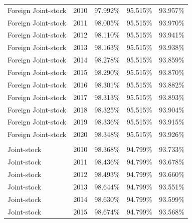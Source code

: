 \documentclass[
  12pt,
  a4paper,
]{scrreprt}
\begin{document}
{{{{\begin{longtable}[t]{llrrr}
\hspace{1em}Foreign Joint-stock & 2010 & 97.992\% & 95.515\% & 93.957\%\\
\hspace{1em}Foreign Joint-stock & 2011 & 98.005\% & 95.515\% & 93.970\%\\
\hspace{1em}Foreign Joint-stock & 2012 & 98.110\% & 95.515\% & 93.941\%\\
\hspace{1em}Foreign Joint-stock & 2013 & 98.163\% & 95.515\% & 93.938\%\\
\hspace{1em}Foreign Joint-stock & 2014 & 98.278\% & 95.515\% & 93.859\%\\
\hspace{1em}Foreign Joint-stock & 2015 & 98.290\% & 95.515\% & 93.870\%\\
\hspace{1em}Foreign Joint-stock & 2016 & 98.301\% & 95.515\% & 93.882\%\\
\hspace{1em}Foreign Joint-stock & 2017 & 98.313\% & 95.515\% & 93.893\%\\
\hspace{1em}Foreign Joint-stock & 2018 & 98.325\% & 95.515\% & 93.904\%\\
\hspace{1em}Foreign Joint-stock & 2019 & 98.336\% & 95.515\% & 93.915\%\\
\hspace{1em}Foreign Joint-stock & 2020 & 98.348\% & 95.515\% & 93.926\%\\
\addlinespace[0.3em]
\multicolumn{5}{l}{\textbf{Joint-stock}}\\
\hspace{1em}Joint-stock & 2010 & 98.368\% & 94.799\% & 93.733\%\\
\hspace{1em}Joint-stock & 2011 & 98.436\% & 94.799\% & 93.678\%\\
\hspace{1em}Joint-stock & 2012 & 98.493\% & 94.799\% & 93.660\%\\
\hspace{1em}Joint-stock & 2013 & 98.644\% & 94.799\% & 93.551\%\\
\hspace{1em}Joint-stock & 2014 & 98.630\% & 94.799\% & 93.599\%\\
\hspace{1em}Joint-stock & 2015 & 98.674\% & 94.799\% & 93.568\%\\

\end{longtable}}}}}
\end{document}
